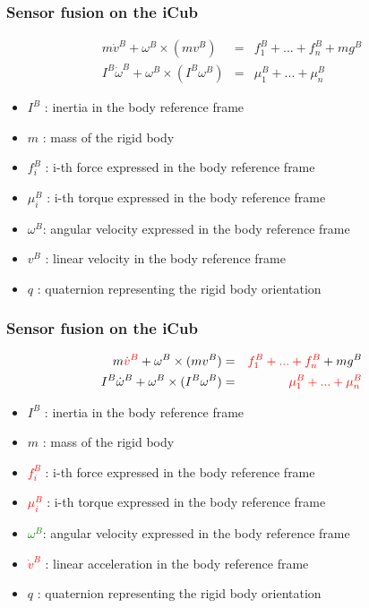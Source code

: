 \documentclass[xcolor=dvipsnames]{beamer}
\begin{document}
\begin{frame}
  \frametitle{Sensor fusion on the iCub}
 \begin{eqnarray*}
m    \dot v^B    + \omega^B \times (m       v^B) & = & f^B_1  + ... + f^B_n + mg^B \\
I^B \dot \omega^B + \omega^B \times (I^B \omega^B) & = & \mu^B_1 + ... + \mu^B_n
\end{eqnarray*}
\begin{itemize}
\item $I^B$    : inertia in the body reference frame
\item $m$      : mass of the rigid body
\item $f^B_i$  : i-th force expressed in the body reference frame
\item $\mu^B_i$ : i-th torque expressed in the body reference frame
\item $\omega^B$: angular velocity expressed in the body reference frame
\item $v^B$    : linear velocity in the body reference frame
\item $q$      : quaternion representing the rigid body orientation
\end{itemize}
\end{frame}

\begin{frame}
  \frametitle{Sensor fusion on the iCub}
 \begin{eqnarray*}
m    \textcolor{red}{\dot v^B}    + \omega^B \times (m       v^B) & = & \textcolor{red}{f^B_1  + ... + f^B_n} + mg^B \\
I^B \dot \omega^B + \omega^B \times (I^B \omega^B) & = & \textcolor{red}{\mu^B_1 + ... + \mu^B_n}
\end{eqnarray*}
\begin{itemize}
\item $I^B$    : inertia in the body reference frame
\item $m$      : mass of the rigid body
\item \textcolor{red}{$f^B_i$}  : i-th force expressed in the body reference frame
\item \textcolor{red}{$\mu^B_i$} : i-th torque expressed in the body reference frame
\item \textcolor{green}{$\omega^B$}: angular velocity expressed in the body reference frame
\item \textcolor{red}{$\dot v^B$}    : linear acceleration in the body reference frame
\item $q$      : quaternion representing the rigid body orientation
\end{itemize}
\end{frame}
\end{document}
